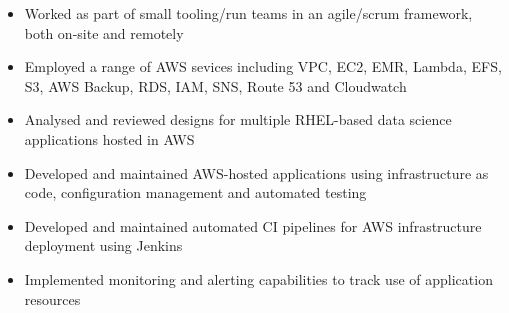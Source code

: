 \documentclass[6pt,a4paper,ragged2e,withhyper]{altacv}
\begin{document}


  \makecvheader


  \begin{paracol}{2}



    \begin{itemize}
      \item Worked as part of small tooling/run teams in an agile/scrum framework, both on-site and remotely
      \item Employed a range of AWS sevices including VPC, EC2, EMR, Lambda, EFS, S3, AWS Backup, RDS, IAM, SNS, Route 53 and Cloudwatch
      \item Analysed and reviewed designs for multiple RHEL-based data science applications hosted in AWS
      \item Developed and maintained AWS-hosted applications using infrastructure as code, configuration management and automated testing
      \item Developed and maintained automated CI pipelines for AWS infrastructure deployment using Jenkins
      \item Implemented monitoring and alerting capabilities to track use of application resources
    \end{itemize}

    \vspace{-0.3cm}\divider


    \vspace{-0.3cm}\divider


    \vspace{-0.3cm}\divider



\end{paracol}
\end{document}
